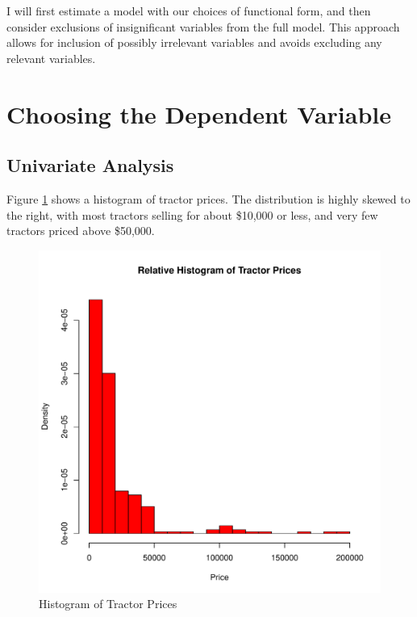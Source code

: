 

I will first estimate a model with our choices of functional form, and then consider exclusions of insignificant variables from the full model. 
This approach allows for inclusion of possibly irrelevant variables and avoids excluding any relevant variables. 


\section{Choosing the Dependent Variable}



\subsection{Univariate Analysis}

Figure \ref{fig:hist_price} shows  a histogram of tractor prices.
The distribution is highly skewed to the right, 
with most tractors selling for about \$10,000 or less,
and very few tractors priced above \$50,000.



\begin{figure}[h!]
  \centering
  \includegraphics[scale = 0.5, keepaspectratio=true]{../Figures/hist_price}
  \caption{Histogram of Tractor Prices} \label{fig:hist_price}
\end{figure}



